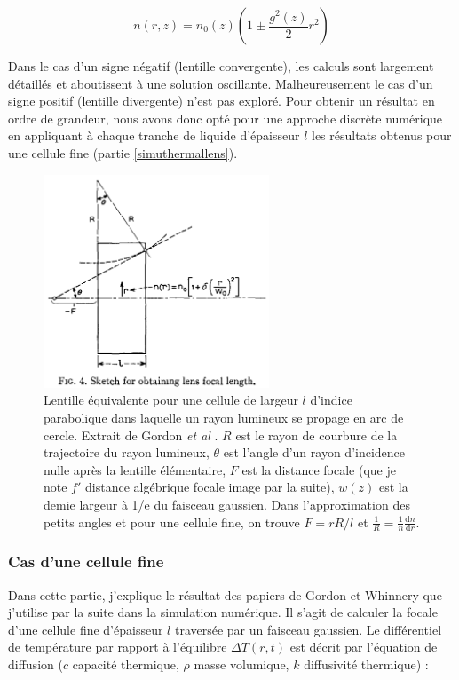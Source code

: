 $$
n(r,z) = n_0(z) \left( 1 \pm \frac{g^2(z)}{2}r^2\right)
$$

Dans le cas d'un signe négatif (lentille convergente), les calculs sont largement détaillés et aboutissent à une solution oscillante. Malheureusement le cas d'un signe positif (lentille divergente) n'est pas exploré. Pour obtenir un résultat en ordre de grandeur, nous avons donc opté pour une approche discrète numérique en appliquant à chaque tranche de liquide d'épaisseur $l$ les résultats obtenus pour une cellule fine (partie \ref{simuthermallens}).

\begin{figure}
    \centering
    \includegraphics[width=0.6\textwidth]{./files/gordon_lens.png}
    \caption{Lentille équivalente pour une cellule de largeur $l$ d'indice parabolique dans laquelle un rayon lumineux se propage en arc de cercle. Extrait de Gordon \emph{et al} \cite{gordon_longtransient_1965}. $R$ est le rayon de courbure de la trajectoire du rayon lumineux, $\theta$ est l'angle d'un rayon d'incidence nulle après la lentille élémentaire, $F$ est la distance focale (que je note $f'$ distance algébrique focale image par la suite), $w(z)$ est la demie largeur à 1/e du faisceau gaussien. Dans l'approximation des petits angles et pour une cellule fine, on trouve $F = rR/l$ et $\frac{1}{R} = \frac{1}{n}\frac{\mathrm{d}n}{\mathrm{d}r}$.
    \label{FIGgordonlens}}
    \end{figure}


\subsubsection{Cas d'une cellule fine}\label{cellulefine}

Dans cette partie, j'explique le résultat des papiers de Gordon et Whinnery que j'utilise par la suite dans la simulation numérique. Il s'agit de calculer la focale d'une cellule fine d'épaisseur $l$ traversée par un faisceau gaussien. Le différentiel de température par rapport à l'équilibre $\Delta T(r,t)$ est décrit par l'équation de diffusion ($c$ capacité thermique, $\rho$ masse volumique, $k$ diffusivité thermique) :

